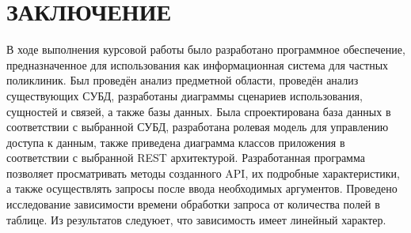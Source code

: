 \section*{\large ЗАКЛЮЧЕНИЕ}

В  ходе  выполнения  курсовой работы  было  разработано  программное обеспечение, предназначенное для использования как информационная система для частных поликлиник.
Был проведён анализ предметной области, проведён анализ существующих СУБД, разработаны диаграммы сценариев использования, сущностей и связей, а также базы данных.
Была спроектирована база данных в соответствии с выбранной СУБД, разработана ролевая модель для управлению доступа к данным,  также приведена диаграмма классов приложения в соответствии с выбранной REST архитектурой.
Разработанная программа позволяет просматривать методы созданного API, их подробные характеристики, а также осуществлять запросы после ввода необходимых аргументов.
Проведено исследование зависимости времени обработки запроса от количества полей в таблице. Из результатов следуюет, что зависимость имеет линейный характер.

\pagebreak